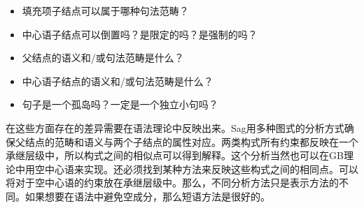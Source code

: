 \begin{exe}
\begin{xlist}[iv.]
\begin{exe}
\begin{xlist}[iv.]
\begin{itemize}
\item 填充项子结点可以属于哪种句法范畴？
\item 中心语子结点可以倒置吗？是限定的吗？是强制的吗？
\item 父结点的语义和/或句法范畴是什么？
\item 中心语子结点的语义和/或句法范畴是什么？
\item 句子是一个孤岛吗？一定是一个独立小句吗？
\end{itemize}
在这些方面存在的差异需要在语法理论中反映出来。Sag用多种图式的分析方式确保父结点的范畴和语义与两个子结点的属性对应。两类构式所有约束都反映在一个承继层级中，所以构式之间的相似点可以得到解释。这个分析当然也可以在GB理论中用空中心语来实现。还必须找到某种方法来反映这些构式之间的相同点。可以将对于空中心语的约束放在承继层级中。那么，不同分析方法只是表示方法的不同。如果想要在语法中避免空成分，那么短语方法是很好的。


\end{xlist}
\end{exe}
\end{xlist}
\end{exe}
